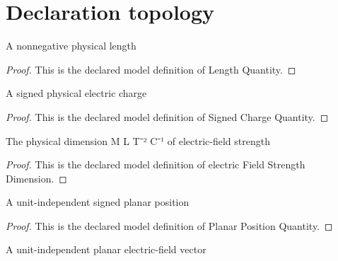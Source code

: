 \section{Declaration topology}
\begin{definition}
  \label{def:physics:phyx-mini-0833:phyxminiproblems-problemphyxmini0833-lengthquantity}
  A nonnegative physical length
\end{definition}
\begin{proof}
  This is the declared model definition of Length Quantity.
\end{proof}
\begin{definition}
  \label{def:physics:phyx-mini-0833:phyxminiproblems-problemphyxmini0833-signedchargequantity}
  A signed physical electric charge
\end{definition}
\begin{proof}
  This is the declared model definition of Signed Charge Quantity.
\end{proof}
\begin{definition}
  \label{def:physics:phyx-mini-0833:phyxminiproblems-problemphyxmini0833-electricfieldstrengthdimension}
  The physical dimension M L T⁻² C⁻¹ of electric-field strength
\end{definition}
\begin{proof}
  This is the declared model definition of electric Field Strength Dimension.
\end{proof}
\begin{definition}
  \label{def:physics:phyx-mini-0833:phyxminiproblems-problemphyxmini0833-planarpositionquantity}
  A unit-independent signed planar position
\end{definition}
\begin{proof}
  This is the declared model definition of Planar Position Quantity.
\end{proof}
\begin{definition}
  \label{def:physics:phyx-mini-0833:phyxminiproblems-problemphyxmini0833-planarelectricfieldquantity}
  A unit-independent planar electric-field vector
\end{definition}
